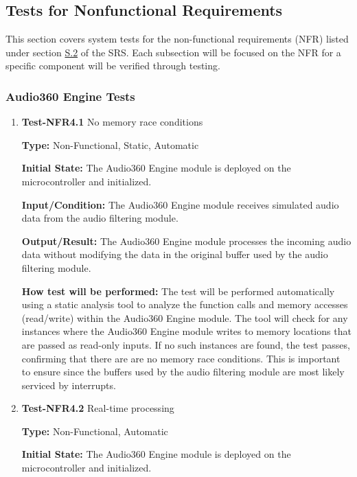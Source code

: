 \documentclass[12pt, titlepage]{article}
\begin{document}
\subsection{Tests for Nonfunctional Requirements}

This section covers system tests for the non-functional requirements (NFR) 
listed under section \hyperref[SRS-sec:S.2]{S.2} of the SRS. Each subsection 
will be focused on the NFR for a specific component will be verified through 
testing.

\subsubsection{Audio360 Engine Tests}

\begin{enumerate}
\item{\textbf{Test-NFR4.1} No memory race conditions\\}

\textbf{Type:} Non-Functional, Static, Automatic

\textbf{Initial State:}
The Audio360 Engine module is deployed on the microcontroller and initialized.

\textbf{Input/Condition:}
The Audio360 Engine module receives simulated audio data from the audio
filtering module.

\textbf{Output/Result:}
The Audio360 Engine module processes the incoming audio data without modifying
the data in the original buffer used by the audio filtering module. 

\textbf{How test will be performed:}
The test will be performed automatically using a static analysis tool
to analyze the function calls and memory accesses (read/write) within the Audio360
Engine module. The tool will check for any instances where the Audio360
Engine module writes to memory locations that are passed as read-only inputs. 
If no such instances are found, the test passes, confirming that there are
are no memory race conditions. This is important to ensure since the buffers
used by the audio filtering module are most likely serviced by interrupts. 

\item{\textbf{Test-NFR4.2} Real-time processing\\}

\textbf{Type:} Non-Functional, Automatic

\textbf{Initial State:}
The Audio360 Engine module is deployed on the microcontroller and initialized.


\end{enumerate}
\end{document}
